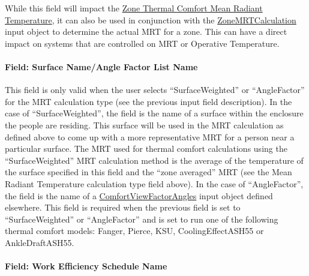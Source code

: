 While this field will impact the \hyperref[zone-thermal-comfort-mean-radiant-temperature-c]{Zone Thermal Comfort Mean Radiant Temperature}, it can also be used in conjunction with the \hyperref[zonemrtcalculation]{ZoneMRTCalculation} input object to determine the actual MRT for a zone. This can have a direct impact on systems that are controlled on MRT or Operative Temperature.

\paragraph{Field: Surface Name/Angle Factor List Name}\label{field-surface-nameangle-factor-list-name}

This field is only valid when the user selects ``SurfaceWeighted'' or ``AngleFactor'' for the MRT calculation type (see the previous input field description). In the case of ``SurfaceWeighted'', the field is the name of a surface within the enclosure the people are residing. This surface will be used in the MRT calculation as defined above to come up with a more representative MRT for a person near a particular surface. The MRT used for thermal comfort calculations using the ``SurfaceWeighted'' MRT calculation method is the average of the temperature of the surface specified in this field and the ``zone averaged'' MRT (see the Mean Radiant Temperature calculation type field above). In the case of ``AngleFactor'', the field is the name of a \hyperref[comfortviewfactorangles]{ComfortViewFactorAngles} input object defined elsewhere. This field is required when the previous field is set to ``SurfaceWeighted'' or ``AngleFactor'' and is set to run one of the following thermal comfort models: Fanger, Pierce, KSU, CoolingEffectASH55 or AnkleDraftASH55.

\paragraph{Field: Work Efficiency Schedule Name}\label{field-work-efficiency-schedule-name}

